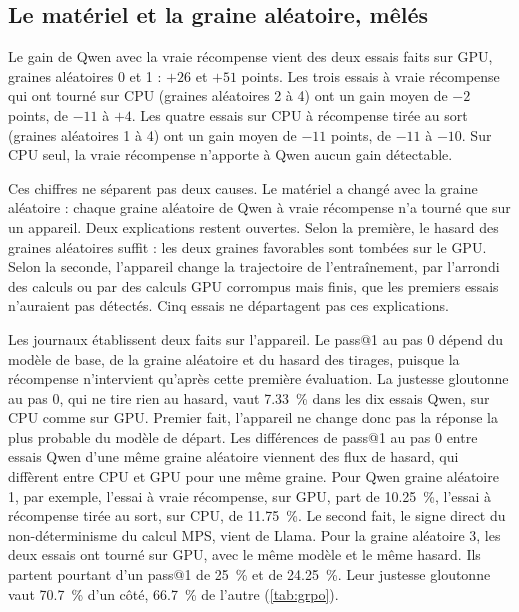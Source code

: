 
\subsection{Le matériel et la graine aléatoire, mêlés}
\label{sec:llm-materiel}

Le gain de Qwen avec la vraie récompense vient des deux essais faits sur GPU, graines aléatoires 0
et 1 : $+26$ et $+51$ points. Les trois essais à vraie récompense qui ont tourné sur CPU (graines aléatoires 2
à 4) ont un gain moyen de $-2$ points, de $-11$ à $+4$. Les quatre essais sur CPU à récompense tirée
au sort (graines aléatoires 1 à 4) ont un gain moyen de $-11$ points, de $-11$ à $-10$. Sur CPU seul, la vraie
récompense n'apporte à Qwen aucun gain détectable.

Ces chiffres ne séparent pas deux causes. Le matériel a changé avec la graine aléatoire : chaque
graine aléatoire de Qwen à vraie récompense n'a tourné que sur un appareil. Deux explications restent
ouvertes. Selon la première, le hasard des graines aléatoires suffit : les deux graines favorables sont tombées
sur le GPU. Selon la seconde, l'appareil change la trajectoire de l'entraînement, par l'arrondi des
calculs ou par des calculs GPU corrompus mais finis, que les premiers essais n'auraient pas
détectés. Cinq essais ne départagent pas ces explications.

Les journaux établissent deux faits sur l'appareil. Le pass@1 au pas 0 dépend
du modèle de base, de la graine aléatoire et du hasard des tirages, puisque la récompense n'intervient qu'après
cette première évaluation. La justesse gloutonne au pas 0, qui ne tire rien au hasard, vaut \num{7.33}~\% dans
les dix essais Qwen, sur CPU comme sur GPU. Premier fait, l'appareil ne change donc pas la réponse la plus
probable du modèle de départ. Les différences de pass@1 au pas 0 entre essais Qwen d'une même graine aléatoire
viennent des flux de hasard, qui diffèrent entre CPU et GPU pour une même graine. Pour Qwen graine aléatoire 1,
par exemple, l'essai à vraie récompense, sur GPU, part de \num{10.25}~\%, l'essai à récompense tirée au sort,
sur CPU, de \num{11.75}~\%. Le second fait, le signe direct du non-déterminisme du calcul MPS, vient de Llama.
Pour la graine aléatoire 3, les deux essais ont tourné sur GPU, avec le même modèle et le même hasard. Ils
partent pourtant d'un pass@1 de 25~\% et de \num{24.25}~\%. Leur justesse gloutonne vaut \num{70.7}~\% d'un
côté, \num{66.7}~\% de l'autre (\cref{tab:grpo}).

